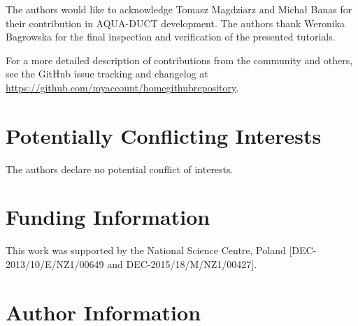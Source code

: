 \documentclass[9pt,tutorial]{livecoms}
\newcommand{\githubrepository}{\url{https://github.com/myaccount/homegithubrepository}}  %
\begin{document}
The authors would like to acknowledge Tomasz Magdziarz and Michał Banas for their contribution in AQUA-DUCT development. The authors thank Weronika Bagrowska for the final inspection and verification of the presented tutorials.

For a more detailed description of contributions from the community and others, see the GitHub issue tracking and changelog at \githubrepository.

\section{Potentially Conflicting Interests}

The authors declare no potential conflict of interests.

\section{Funding Information}
This work was supported by the National Science Centre, Poland [DEC-2013/10/E/NZ1/00649 and \newline DEC-2015/18/M/NZ1/00427]. 

\section*{Author Information}
\makeorcid




\end{document}
